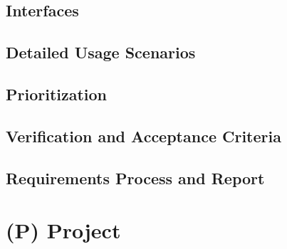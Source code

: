 \documentclass{article}
\begin{document}
\subsection{Interfaces}\label{subsec:interfaces}

\subsection{Detailed Usage Scenarios}\label{subsec:detailed-usage-scenarios}

\subsection{Prioritization}\label{subsec:prioritization}

\subsection{Verification and Acceptance Criteria}\label{subsec:verification-and-acceptance-criteria}

\subsection{Requirements Process and Report}\label{subsec:requirements-process-and-report}

\newpage{}


\section*{(P) Project}\label{sec:srs_project}
\renewcommand{\thesubsection}{P.\arabic{subsection}}
\setcounter{subsection}{0}
\end{document}
